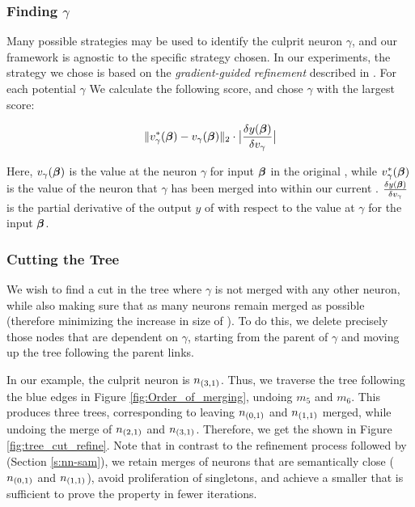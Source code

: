 \subsubsection{Finding $\gamma$}
\label{s:finding-gamma}

Many possible strategies may be used to identify the culprit neuron $\gamma$,
and our framework is agnostic to the specific strategy chosen. In our
experiments, the strategy we chose is based on the
\emph{gradient-guided refinement} described in \cite{lin-comb-abs-jan}. For each
potential $\gamma$ We calculate the following score, and chose $\gamma$ with the
largest score:

\begin{equation*}
\begin{aligned}
    \|v^{*}_{\gamma}(\boldsymbol{\beta}) - v_{\gamma}(\boldsymbol{\beta})\|_{2} \cdot 
    \big| \frac{\delta y(\boldsymbol{\beta})}{\delta v_{\gamma}} \big|
\end{aligned}
\end{equation*}

Here, 
$v_{\gamma}(\boldsymbol{\beta})$ is the value at the neuron $\gamma$ for input
$\boldsymbol{\beta}$ in the original \cnc, while $v^{*}_{\gamma}(\boldsymbol{\beta})$ is the
value of the neuron that $\gamma$ has been merged into within our current \abs.
$\frac{\delta y(\boldsymbol{\beta})}{\delta v_{\gamma}}$ is the partial derivative of
the output $y$ of \cnc with respect to the value at $\gamma$ for the input
$\boldsymbol{\beta}$.

\subsubsection{Cutting the Tree}

We wish to find a cut in the tree where $\gamma$ is not merged with any other
neuron, while also making sure that as many neurons remain merged as possible
(therefore minimizing the increase in size of \abs). To do this, we delete
precisely those nodes that are dependent on $\gamma$, starting from the parent
of $\gamma$ and moving up the tree following the parent links.

In our example, the culprit neuron is $n_{(3,1)}$. Thus, we traverse the tree
following the blue edges in Figure \ref{fig:Order_of_merging}, undoing $m_5$ and
$m_6$. This produces three trees, corresponding to leaving $n_{(0,1)}$ and
$n_{(1,1)}$ merged, while undoing the merge of $n_{(2,1)}$ and $n_{(3,1)}$.
Therefore, we get the \abs shown in Figure \ref{fig:tree_cut_refine}. Note
that in contrast to the refinement process followed by \cite{cegar-nn} (Section
\ref{s:nn-sam}), we retain merges of neurons that are semantically close
($n_{(0,1)}$ and $n_{(1,1)}$), avoid
proliferation of singletons, and achieve a smaller \abs that is sufficient to
prove the property in fewer iterations.

